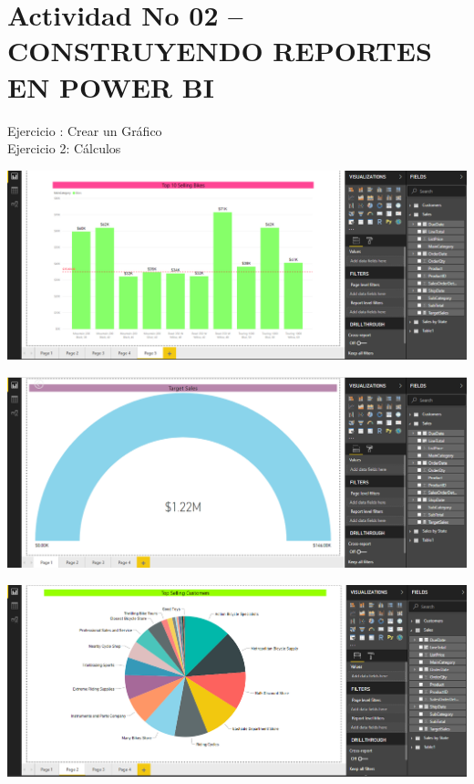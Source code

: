 \section{Actividad No 02 – CONSTRUYENDO REPORTES EN POWER BI} 

Ejercicio :  Crear un Gráfico \\
Ejercicio 2: Cálculos \\

	\begin{center}
	\includegraphics[width=18cm]{./Imagenes/Imagen12}
	\end{center}	

	\begin{center}
	\includegraphics[width=18cm]{./Imagenes/Imagen13}
	\end{center}	

	\begin{center}
	\includegraphics[width=18cm]{./Imagenes/Imagen14}
	\end{center}	

